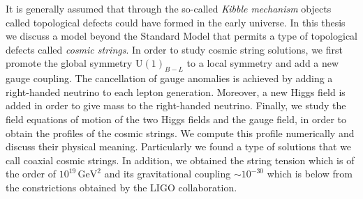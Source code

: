 It is generally assumed that through the so-called \textit{Kibble mechanism} objects called topological defects could have formed in the early universe. In this thesis we discuss a model beyond the Standard Model that permits a type of topological defects called \textit{cosmic strings}. In order to study cosmic string solutions, we first promote the global symmetry U$(1)_{B-L}$ to a local symmetry and add a new gauge coupling. The cancellation of gauge anomalies is achieved by adding a right-handed neutrino to each lepton generation. More\-over, a new Higgs field is added in order to give mass to the right-handed neutrino.  
Finally, we study the field equations of motion of the two Higgs fields and the gauge field, in order to obtain the profiles of the cosmic strings. We compute this profile numerically and discuss their physical meaning. Particularly we found a type of solutions that we call coaxial cosmic strings.  In addition, we obtained the string tension which is of the order of $10^{19}\,\text{GeV}^2$ and its gravitational coupling $\sim 10^{-30}$ which is below from the constrictions obtained by the LIGO collaboration.